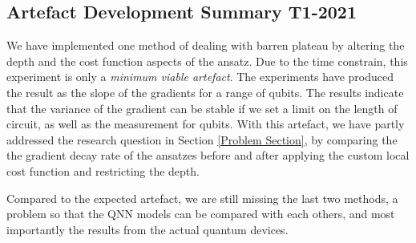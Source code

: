 \subsection{Artefact Development Summary T1-2021}
We have implemented one method of dealing with barren plateau by altering the depth and the cost function aspects of the ansatz.
Due to the time constrain, this experiment is only a \textit{minimum viable artefact}.
The experiments have produced the result as the slope of the gradients for a range of qubits.
The results indicate that the variance of the gradient can be stable if we set a limit on the length of circuit, as well as the measurement for qubits.
With this artefact, we have partly addressed the research question in Section \ref{Problem Section}, by comparing the the gradient decay rate of the ansatzes before and after applying the custom local cost function and restricting the depth.

Compared to the expected artefact, we are still missing the last two methods, a problem so that the QNN models can be compared with each others, and most importantly the results from the actual quantum devices.